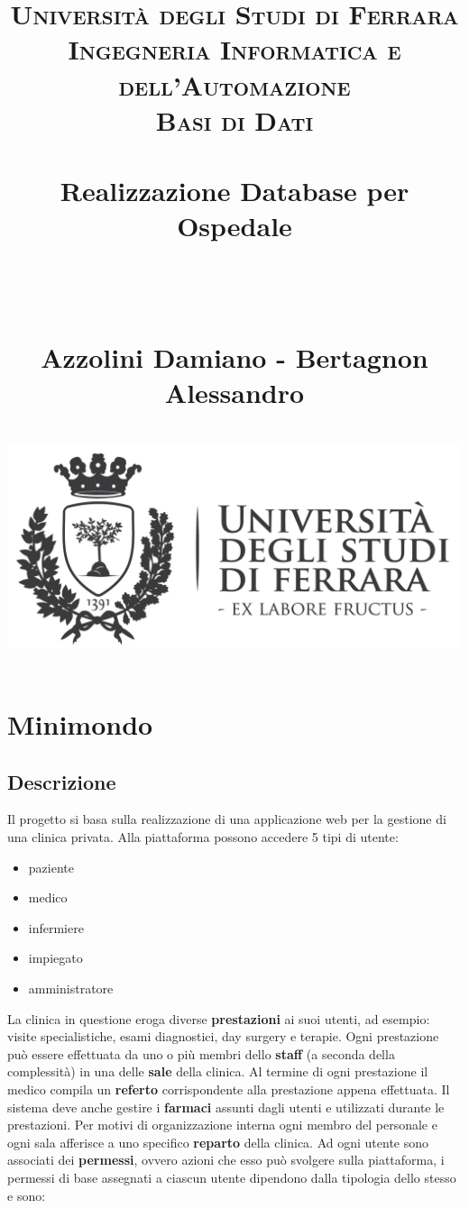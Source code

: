 \documentclass[paper=a4, fontsize=11pt,x11names]{report}
\title{
		\usefont{OT1}{bch}{b}{n}
		\normalfont \normalsize \textsc{Universit\`a degli Studi di Ferrara \\ Ingegneria Informatica e dell'Automazione
			\\ Basi di Dati} \\ [25pt]
		\horrule{0.5pt} \\[0.4cm]
		\Huge Realizzazione Database per Ospedale \date{}\\%
		\horrule{0.5pt} \\[0.4cm]
		\LARGE Azzolini Damiano - Bertagnon Alessandro \\ [0.4cm]
		\horrule{2pt} \\[0.8cm]
		\includegraphics{logoUnife}
}
\begin{document}
\maketitle

\newpage

\tableofcontents
\thispagestyle{empty}

\listoffigures
\thispagestyle{empty}


\newpage





\chapter{Minimondo}
\section{Descrizione}
Il progetto si basa sulla realizzazione di una applicazione web per la gestione di una clinica privata. Alla piattaforma possono accedere 5 tipi di utente:
\begin{itemize}
\item paziente
\item medico
\item infermiere
\item impiegato
\item amministratore
\end{itemize}  

La clinica in questione eroga diverse \textbf{prestazioni} ai suoi utenti, ad esempio: visite specialistiche, esami diagnostici, day surgery e terapie. Ogni prestazione può essere effettuata da uno o più membri dello \textbf{staff} (a seconda della complessità) in una delle \textbf{sale} della clinica. Al termine di ogni prestazione il medico compila un \textbf{referto} corrispondente alla prestazione appena effettuata. Il sistema deve anche gestire i \textbf{farmaci} assunti dagli utenti e utilizzati durante le prestazioni. Per motivi di organizzazione interna ogni membro del personale e ogni sala afferisce a uno specifico \textbf{reparto} della clinica. Ad ogni utente sono associati dei \textbf{permessi}, ovvero  azioni che esso può svolgere sulla piattaforma, i permessi di base assegnati a ciascun utente dipendono dalla tipologia dello stesso e sono:\\
\end{document}
